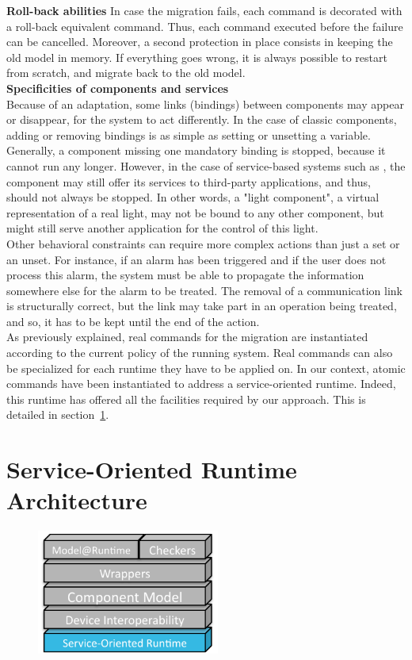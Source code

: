 {\bf Roll-back abilities}
In case the migration fails, each command is decorated with a roll-back equivalent command. Thus, each command executed before the failure can be cancelled. Moreover, a second protection in place consists in keeping the old model in memory. If everything goes wrong, it is always possible to restart from scratch, and migrate back to the old model.\\

{\bf Specificities of components and services}\\
Because of an adaptation, some links (bindings) between components may appear or disappear, for the system to act differently. In the case of classic components, adding or removing bindings is as simple as setting or unsetting a variable. Generally, a component missing one mandatory binding is stopped, because it cannot run any longer. However, in the case of service-based systems such as \enti{}, the component may still offer its services to third-party applications, and thus, should not always be stopped. In other words, a "light component", a virtual representation of a real light, may not be bound to any other component, but might still serve another application for the control of this light.\\
Other behavioral constraints can require more complex actions than just a set or an unset. For instance, if an alarm has been triggered and if the user does not process this alarm, the system must be able to propagate the information somewhere else for the alarm to be treated. The removal of a communication link is structurally correct, but the link may take part in an operation being treated, and so, it has to be kept until the end of the action.\\

As previously explained, real commands for the migration are instantiated according to the current policy of the running system. Real commands can also be specialized for each runtime they have to be applied on. In our context, atomic commands have been instantiated to address a service-oriented runtime. Indeed, this runtime has offered all the facilities required by our approach. This is detailed in section~\ref{sec:soaruntime}.

\newpage
\section{Service-Oriented Runtime Architecture}
\label{sec:soaruntime}
\begin{figure}
  \vspace{-5mm}
  \includegraphics[width=60mm]{part2/pics/layers/SoaRt}
  \vspace{-5mm}
\end{figure}

